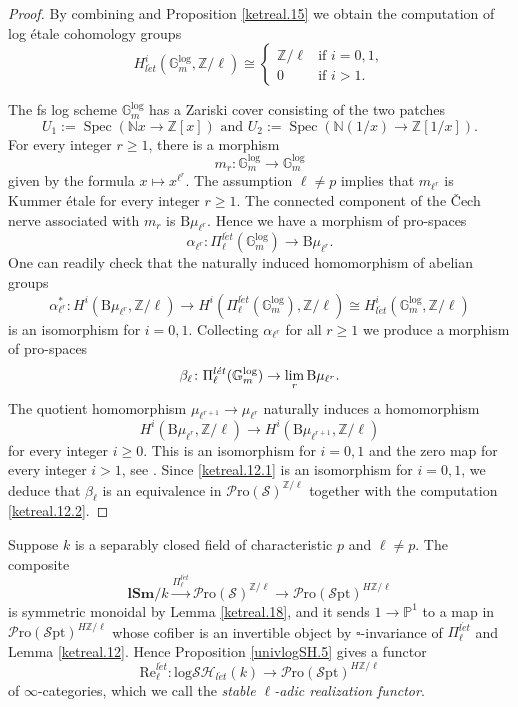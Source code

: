 \documentclass[11pt, a4paper]{amsart}
\theoremstyle{definition}
\numberwithin{equation}{subsection}
\newcommand{\N}{\mathbb{N}}
\newcommand{\Z}{\mathbb{Z}}
\renewcommand{\P}{\mathbb{P}}
\newcommand{\lSm}{\mathbf{lSm}}
\providecommand{\Spec}[1]{\operatorname{Spec}(#1)} 	%
\newcommand{\limit}{\mathop{\rm lim}}
\newcommand{\Real}{\mathrm{Re}}
\newcommand{\leta}{{l\acute{e}t}}
\newcommand{\clspace}{\mathrm{B}}
\newcommand{\Eilenberg}{H}
\newcommand{\boxx}{\square}
\newcommand{\Gmm}{\mathbb{G}_m^{\mathrm{log}}}
\newcommand{\infSpc}{\mathcal{S}}
\newcommand{\infSpt}{\mathcal{S}\mathrm{pt}}
\newcommand{\infPro}{\mathcal{P}\mathrm{ro}}
\newcommand{\inflogSH}{\mathrm{log}\mathcal{SH}}
\begin{document}
\begin{proof}
By combining \cite[Corollary 7.5]{MR1922832} and Proposition \ref{ketreal.15} we obtain the computation of 
log \'etale cohomology groups
\begin{equation}
\label{ketreal.12.2}
H_{\leta}^i(\Gmm,\Z/\ell)
\cong
\left\{
\begin{array}{ll}
\Z/\ell & \text{if }i=0,1,
\\
0 & \text{if }i>1.
\end{array}
\right.
\end{equation}

The fs log scheme $\Gmm$ has a Zariski cover consisting of the two patches
\[
U_1:=\Spec{\N x\to \Z[x]}
\text{ and }
U_2:=\Spec{\N (1/x) \to \Z[1/x]}.
\]
For every integer $r\geq 1$, there is a morphism
\[
m_r
\colon
\Gmm\to \Gmm
\]
given by the formula $x\mapsto x^{\ell^r}$.
The assumption $\ell\neq p$ implies that $m_{\ell^r}$ is Kummer \'etale for every integer $r\geq 1$.
The connected component of the \v{C}ech nerve associated with $m_r$ is $\clspace \mu_{\ell^r}$.
Hence we have a morphism of pro-spaces
\[
\alpha_{\ell^r}
\colon
\Pi_{\ell}^{\leta}(\Gmm) \to \clspace \mu_{\ell^r}.
\]
One can readily check that the naturally induced homomorphism of abelian groups
\begin{equation}
\label{ketreal.12.1}
\alpha_{\ell^r}^*
\colon
H^i(\clspace \mu_{\ell^r},\Z/\ell)
\to
H^i(\Pi_{\ell}^{\leta}(\Gmm),\Z/\ell)
\cong
H_{\leta}^i(\Gmm,\Z/\ell)
\end{equation}
is an isomorphism for $i=0,1$.
Collecting $\alpha_{\ell^r}$ for all $r\geq 1$ we produce a morphism of pro-spaces
\[
\beta_{\ell}
\colon
\Pi_{\ell}^{\leta}(\Gmm) \to \limit_r \clspace \mu_{\ell^r}.
\]
The quotient homomorphism $\mu_{\ell^{r+1}}\to \mu_{\ell^r}$ naturally induces a homomorphism
\[
H^i(\clspace\mu_{\ell^r},\Z/\ell)
\to
H^i(\clspace\mu_{\ell^{r+1}},\Z/\ell)
\]
for every integer $i\geq 0$.
This is an isomorphism for $i=0,1$ and the zero map for every integer $i>1$, see \cite[Exercise 1, \S XIII.1]{zbMATH03657912}.
Since \eqref{ketreal.12.1} is an isomorphism for $i=0,1$, we deduce that $\beta_\ell$ is an equivalence in $\infPro(\infSpc)^{\Z/\ell}$ together with the computation \eqref{ketreal.12.2}.
\end{proof}

Suppose $k$ is a separably closed field of characteristic $p$ and $\ell\neq p$.
The composite
\[
\lSm/k
\xrightarrow{\Pi_{\ell}^{\leta}}
\infPro(\infSpc)^{\Z/\ell}
\to
\infPro(\infSpt)^{\Eilenberg \Z/\ell}
\]
is symmetric monoidal by Lemma \ref{ketreal.18}, 
and it sends $1\to \P^1$ to a map in $\infPro(\infSpt)^{\Eilenberg \Z/\ell}$ whose cofiber is an invertible object by 
$\boxx$-invariance of $\Pi_{\ell}^{\leta}$ and Lemma \ref{ketreal.12}.
Hence Proposition \ref{univlogSH.5} gives a functor\index{Rellet @ $\Real_{\ell}^{\leta}$}
\begin{equation}
\label{ketreal.12.3}
\Real_{\ell}^{\leta}
\colon
\inflogSH_{\leta}(k)
\to
\infPro(\infSpt)^{\Eilenberg \Z/\ell}
\end{equation}
of $\infty$-categories, which we call the \emph{stable $\ell$-adic realization functor}.
\end{document}

